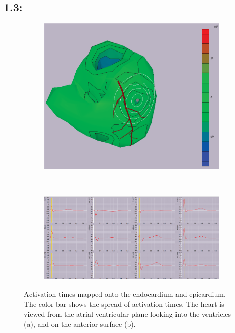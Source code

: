 \documentclass[12pt]{article}
\begin{document}
\subsection{1.3: }
\begin{figure}[H]
	\begin{subfigure}{.75\textwidth}
		\centering
		\includegraphics[width=.95\linewidth]{Figures/1_3_pot_1.png}
		\caption{}
		
	\end{subfigure}%
\\
	\begin{subfigure}{.95\textwidth}
		\centering
		\includegraphics[width=.95\linewidth]{Figures/1_3_ecg_1.png}
		\caption{}
		
	\end{subfigure}
	\caption{Activation times mapped onto the endocardium and epicardium. The color bar shows the spread of activation times. The heart is viewed from the atrial ventricular plane looking into the ventricles (a), and on the anterior surface (b).}
	\label{1_3_1}
\end{figure}
\end{document}
